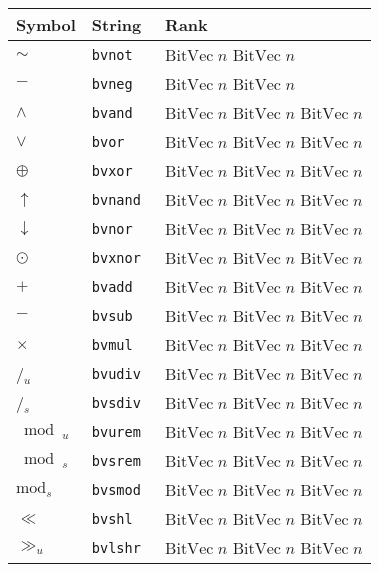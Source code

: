 \begin{table}
\centering
\begin{tabular}{lll}
\toprule
\textbf{Symbol} & \textbf{String} & \textbf{Rank} \\
\midrule
$\sim$ & \tt{bvnot} & \(\mathrm{BitVec}\;n\)\; \(\mathrm{BitVec}\;n\) \\
$-$   & \tt{bvneg} & \(\mathrm{BitVec}\;n\)\; \(\mathrm{BitVec}\;n\) \\
$\land$ & \tt{bvand} & \(\mathrm{BitVec}\;n\)\; \(\mathrm{BitVec}\;n\)\; \(\mathrm{BitVec}\;n\) \\
$\lor$  & \tt{bvor}  & \(\mathrm{BitVec}\;n\)\; \(\mathrm{BitVec}\;n\)\; \(\mathrm{BitVec}\;n\) \\
$\oplus$& \tt{bvxor} & \(\mathrm{BitVec}\;n\)\; \(\mathrm{BitVec}\;n\)\; \(\mathrm{BitVec}\;n\) \\
$\uparrow$ & \tt{bvnand} & \(\mathrm{BitVec}\;n\)\; \(\mathrm{BitVec}\;n\)\; \(\mathrm{BitVec}\;n\) \\
$\downarrow$ & \tt{bvnor}  & \(\mathrm{BitVec}\;n\)\; \(\mathrm{BitVec}\;n\)\; \(\mathrm{BitVec}\;n\) \\
$\odot$ & \tt{bvxnor} & \(\mathrm{BitVec}\;n\)\; \(\mathrm{BitVec}\;n\)\; \(\mathrm{BitVec}\;n\) \\
$+$ & \tt{bvadd} & \(\mathrm{BitVec}\;n\)\; \(\mathrm{BitVec}\;n\)\; \(\mathrm{BitVec}\;n\) \\
$-$ & \tt{bvsub} & \(\mathrm{BitVec}\;n\)\; \(\mathrm{BitVec}\;n\)\; \(\mathrm{BitVec}\;n\) \\
$\times$ & \tt{bvmul} & \(\mathrm{BitVec}\;n\)\; \(\mathrm{BitVec}\;n\)\; \(\mathrm{BitVec}\;n\) \\
/\(_u\) & \tt{bvudiv} & \(\mathrm{BitVec}\;n\)\; \(\mathrm{BitVec}\;n\)\; \(\mathrm{BitVec}\;n\) \\
/\(_s\) & \tt{bvsdiv} & \(\mathrm{BitVec}\;n\)\; \(\mathrm{BitVec}\;n\)\; \(\mathrm{BitVec}\;n\) \\
$\bmod_u$ & \tt{bvurem} & \(\mathrm{BitVec}\;n\)\; \(\mathrm{BitVec}\;n\)\; \(\mathrm{BitVec}\;n\) \\
$\bmod_s$ & \tt{bvsrem} & \(\mathrm{BitVec}\;n\)\; \(\mathrm{BitVec}\;n\)\; \(\mathrm{BitVec}\;n\) \\
$\mathrm{mod}_s$ & \tt{bvsmod} & \(\mathrm{BitVec}\;n\)\; \(\mathrm{BitVec}\;n\)\; \(\mathrm{BitVec}\;n\) \\
$\ll$ & \tt{bvshl}  & \(\mathrm{BitVec}\;n\)\; \(\mathrm{BitVec}\;n\)\; \(\mathrm{BitVec}\;n\) \\
$\gg_u$ & \tt{bvlshr} & \(\mathrm{BitVec}\;n\)\; \(\mathrm{BitVec}\;n\)\; \(\mathrm{BitVec}\;n\) \\

\end{tabular}
\end{table}
